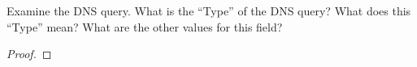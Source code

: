 \documentclass[../../main.tex]{subfiles}
\begin{document}
\begin{wts}
Examine the DNS query. What is the “Type” of the DNS query? What does this “Type” mean? What are the other values for this field?
\end{wts}
\begin{proof}

\end{proof}
\end{document}
